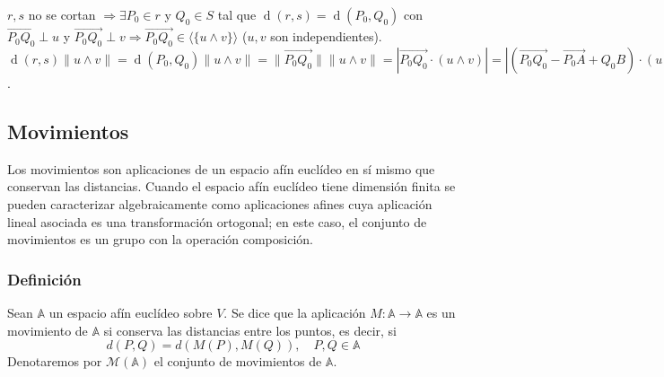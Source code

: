 \documentclass[12pt, a4paper, ones, notitlepage, openany,titlepage]{article}
\newcommand{\distancia}[1]{\operatorname{d}(#1)}
\begin{document}
$r,s$ no se cortan $\Longrightarrow \exists P_0 \in r$ y $Q_0 \in S$ tal que $\distancia{r,s} = \distancia{P_0,Q_0}$ con $\overrightarrow{P_0 Q_0} \perp u$ y $\overrightarrow{P_0 Q_0} \perp v \Longrightarrow \overrightarrow{P_0 Q_0} \in \langle \{u \wedge v\} \rangle$ ($u,v$ son independientes). $\distancia{r,s} \|u \wedge v\| = \distancia{P_0,Q_0} \|u \wedge v\| = \|\overrightarrow{P_0 Q_0}\| \|u \wedge v\| = |\overrightarrow{P_0 Q_0} \cdot (u \wedge v)| = |(\overrightarrow{P_0 Q_0} - \overrightarrow{P_0 A} + Q_0 B) \cdot (u \wedge v)| = |\overrightarrow{AB} \cdot (u \wedge v)| = |(\overrightarrow{AB} u v)$.

\subsection{Movimientos}
Los movimientos son aplicaciones de un espacio afín euclídeo en sí mismo que conservan las distancias. Cuando el espacio afín euclídeo tiene dimensión finita se pueden caracterizar algebraicamente como aplicaciones afines cuya aplicación lineal asociada es una transformación ortogonal; en este caso, el conjunto de movimientos es un grupo con la operación composición.

\subsubsection{Definición}
Sean $\mathbb{A}$ un espacio afín euclídeo sobre $V$. Se dice que la aplicación $M: \mathbb{A} \rightarrow \mathbb{A}$ es un movimiento de $\mathbb{A}$ si conserva las distancias entre los puntos, es decir, si
$$
d(P, Q)=d(M(P), M(Q)), \quad P, Q \in \mathbb{A}
$$
\noindent Denotaremos por $\mathcal{M}(\mathbb{A})$ el conjunto de movimientos de $\mathbb{A}$.
\end{document}
